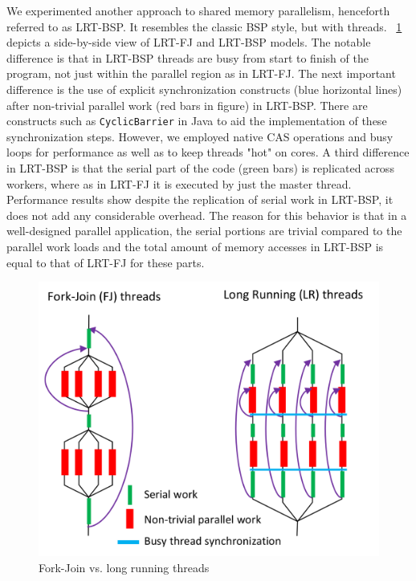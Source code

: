 \documentclass[10pt, conference, compsocconf]{IEEEtran}
\begin{document}
We experimented another approach to shared memory parallelism, henceforth referred to as \ac{LRT-BSP}. It resembles the classic \ac{BSP} style, but with threads. \figurename~\ref{fig:fig_fj_vs_lrt} depicts a side-by-side view of \ac{LRT-FJ} and \ac{LRT-BSP} models. The notable difference is that in \ac{LRT-BSP} threads are busy from start to finish of the program, not just within the parallel region as in \ac{LRT-FJ}. The next important difference is the use of explicit synchronization constructs (blue horizontal lines) after non-trivial parallel work (red bars in figure) in \ac{LRT-BSP}. There are constructs such as \texttt{CyclicBarrier} in Java to aid the implementation of these synchronization steps. However, we employed native \ac{CAS} operations and busy loops for performance as well as to keep threads "hot" on cores.  A third difference in \ac{LRT-BSP} is that the serial part of the code (green bars) is replicated across workers, where as in \ac{LRT-FJ} it is executed by just the master thread. Performance results show despite the replication of serial work in \ac{LRT-BSP}, it does not add any considerable overhead. The reason for this behavior is that in a well-designed parallel application, the serial portions are trivial compared to the parallel work loads and the total amount of memory accesses in \ac{LRT-BSP} is equal to that of \ac{LRT-FJ} for these parts. 

\begin{figure}[!h]
\centering
\includegraphics[width=0.9\columnwidth]{images/fig_fj_vs_lrt}
\caption{Fork-Join vs. long running threads}
\label{fig:fig_fj_vs_lrt}
\end{figure}
\end{document}
